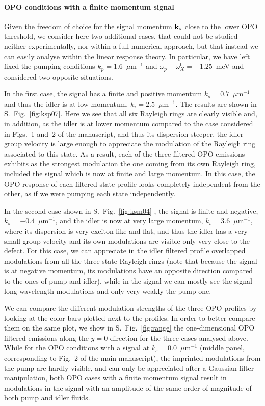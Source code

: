 \paragraph{OPO conditions with a finite momentum signal ---}
%
Given the freedom of choice for the signal momentum ${\mathbf k}_s$ close
to the lower OPO threshold, we consider here two additional cases,
that could not be studied neither experimentally, nor within a full
numerical approach, but that instead we can easily analyse within the
linear response theory.
%
In particular, we have left fixed the pumping conditions
$k_p=1.6$~$\mu$m$^{-1}$ and $\omega_p-\omega_X^0=-1.25$~meV and
considered two opposite situations.


In the first case, the signal has a finite and positive momentum $k_s
= 0.7$~$\mu$m$^{-1}$ and thus the idler is at low momentum, $k_i
=2.5$~$\mu$m$^{-1}$. The results are shown in S.~Fig.~\ref{fig:ksp07}.
%
Here we see that all six Rayleigh rings are clearly visible and, in
addition, as the idler is at lower momentum compared to the case
considered in Figs.~1 and~2 of the manuscript, and thus its dispersion
steeper, the idler group velocity is large enough to appreciate the
modulation of the Rayleigh ring associated to this state. As a result,
each of the three filtered OPO emissions exhibits as the strongest
modulation the one coming from its own Rayleigh ring, included the
signal which is now at finite and large momentum. In this case, the
OPO response of each filtered state profile looks completely
independent from the other, as if we were pumping each state
independently.

In the second case shown in S.~Fig.~\ref{fig:ksm04} , the signal is
finite and negative, $k_s = -0.4$~$\mu$m$^{-1}$, and the idler is now
at very large momentum, $k_i = 3.6$~$\mu$m$^{-1}$, where its
dispersion is very exciton-like and flat, and thus the idler has a
very small group velocity and its own modulations are visible only
very close to the defect. For this case, we can appreciate in the
idler filtered profile overlapped modulations from all the three state
Rayleigh rings (note that because the signal is at negative momentum,
its modulations have an opposite direction compared to the ones of
pump and idler), while in the signal we can mostly see the signal long
wavelength modulations and only very weakly the pump one.


We can compare the different modulation strengths of the three OPO
profiles by looking at the color bars plotted next to the profiles. In
order to better compare them on the same plot, we show in
S.~Fig.~\ref{fig:range} the one-dimensional OPO filtered emissions
along the $y=0$ direction for the three cases analysed above. While
for the OPO conditions with a signal at $k_s = 0.0$~$\mu$m$^{-1}$
(middle panel, corresponding to Fig.~2 of the main manuscript), the
imprinted modulations from the pump are hardly visible, and can only
be appreciated after a Gaussian filter manipulation, both OPO cases
with a finite momentum signal result in modulations in the signal with
an amplitude of the same order of magnitude of both pump and idler
fluids.

